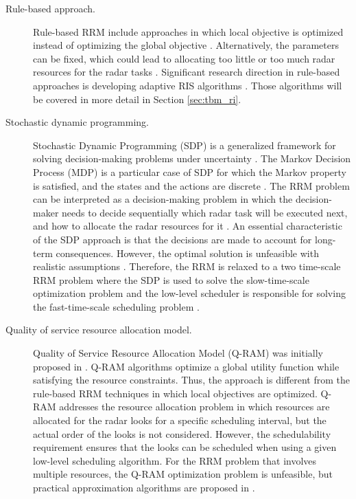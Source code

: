 \documentclass[english, 12pt, a4paper, elec, utf8, a-1b, online]{aaltothesis}
\begin{document}
\begin{description}

\item[Rule-based approach.]

Rule-based RRM include approaches in which local objective is optimized instead of optimizing the global objective \cite{Koch1999}.
Alternatively, the parameters can be fixed, which could lead to allocating too little or too much radar resources for the radar tasks \cite{Hoffmann2014}.
Significant research direction in rule-based approaches is developing adaptive RIS algorithms \cite{Cohen1986, Gardner1988, Munu1992, ChengTing2007, Baek2010, Watson1993, Charlish2015, Keuk1975, Shin1995, Benoudnine2006}. Those algorithms will be covered in more detail in Section \ref{sec:tbm_ri}.


\item[Stochastic dynamic programming.]

Stochastic Dynamic Programming (SDP) is a generalized framework for solving decision-making problems under uncertainty \cite{Ross1983}. 
The Markov Decision Process (MDP) is a particular case of SDP for which the Markov property is satisfied, and the states and the actions are discrete \cite{Ross1983}.
The RRM problem can be interpreted as a decision-making problem in which the decision-maker needs to decide sequentially which radar task will be executed next, and how to allocate the radar resources for it \cite{Krishnamurthy2001, Wintenby2006, LaScala2006}.
An essential characteristic of the SDP approach is that the decisions are made to account for long-term consequences.
However, the optimal solution is unfeasible with realistic assumptions \cite{Wintenby2006}.
Therefore, the RRM is relaxed to a two time-scale RRM problem where the SDP is used to solve the slow-time-scale optimization problem and the low-level scheduler is responsible for solving the fast-time-scale scheduling problem \cite{Wintenby2006}.  


\item[Quality of service resource allocation model.] 

Quality of Service Resource Allocation Model (Q-RAM) was initially proposed in \cite{Rajkumar1997}.
Q-RAM algorithms optimize a global utility function while satisfying the resource constraints.
Thus, the approach is different from the rule-based RRM techniques in which local objectives are optimized.
Q-RAM addresses the resource allocation problem in which resources are allocated for the radar looks for a specific scheduling interval, but the actual order of the looks is not considered.
However, the schedulability requirement ensures that the looks can be scheduled when using a given low-level scheduling algorithm. 
For the RRM problem that involves multiple resources, the Q-RAM optimization problem is unfeasible, but practical approximation algorithms are proposed in \cite{Rajkumar1998, Irci2010, Charlish2015a}.


\end{description}
\end{document}
